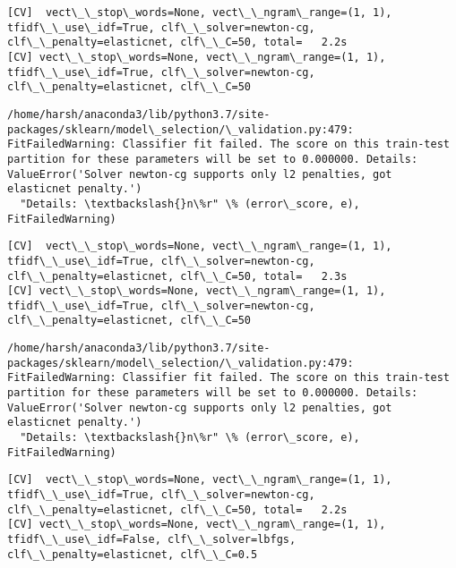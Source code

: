 \documentclass[11pt]{article}
\begin{document}
    \begin{Verbatim}[commandchars=\\\{\}]
[CV]  vect\_\_stop\_words=None, vect\_\_ngram\_range=(1, 1), tfidf\_\_use\_idf=True, clf\_\_solver=newton-cg, clf\_\_penalty=elasticnet, clf\_\_C=50, total=   2.2s
[CV] vect\_\_stop\_words=None, vect\_\_ngram\_range=(1, 1), tfidf\_\_use\_idf=True, clf\_\_solver=newton-cg, clf\_\_penalty=elasticnet, clf\_\_C=50 

    \end{Verbatim}

    \begin{Verbatim}[commandchars=\\\{\}]
/home/harsh/anaconda3/lib/python3.7/site-packages/sklearn/model\_selection/\_validation.py:479: FitFailedWarning: Classifier fit failed. The score on this train-test partition for these parameters will be set to 0.000000. Details: 
ValueError('Solver newton-cg supports only l2 penalties, got elasticnet penalty.')
  "Details: \textbackslash{}n\%r" \% (error\_score, e), FitFailedWarning)

    \end{Verbatim}

    \begin{Verbatim}[commandchars=\\\{\}]
[CV]  vect\_\_stop\_words=None, vect\_\_ngram\_range=(1, 1), tfidf\_\_use\_idf=True, clf\_\_solver=newton-cg, clf\_\_penalty=elasticnet, clf\_\_C=50, total=   2.3s
[CV] vect\_\_stop\_words=None, vect\_\_ngram\_range=(1, 1), tfidf\_\_use\_idf=True, clf\_\_solver=newton-cg, clf\_\_penalty=elasticnet, clf\_\_C=50 

    \end{Verbatim}

    \begin{Verbatim}[commandchars=\\\{\}]
/home/harsh/anaconda3/lib/python3.7/site-packages/sklearn/model\_selection/\_validation.py:479: FitFailedWarning: Classifier fit failed. The score on this train-test partition for these parameters will be set to 0.000000. Details: 
ValueError('Solver newton-cg supports only l2 penalties, got elasticnet penalty.')
  "Details: \textbackslash{}n\%r" \% (error\_score, e), FitFailedWarning)

    \end{Verbatim}

    \begin{Verbatim}[commandchars=\\\{\}]
[CV]  vect\_\_stop\_words=None, vect\_\_ngram\_range=(1, 1), tfidf\_\_use\_idf=True, clf\_\_solver=newton-cg, clf\_\_penalty=elasticnet, clf\_\_C=50, total=   2.2s
[CV] vect\_\_stop\_words=None, vect\_\_ngram\_range=(1, 1), tfidf\_\_use\_idf=False, clf\_\_solver=lbfgs, clf\_\_penalty=elasticnet, clf\_\_C=0.5 

    \end{Verbatim}
\end{document}
